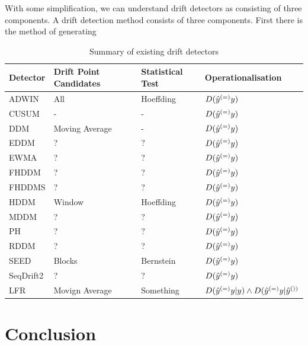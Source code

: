 With some simplification, we can understand drift detectors as consisting of three components. A drift detection method consists of three components. First there is the method of generating 

\begin{table}[]
    \centering
    \begin{tabular}{|l|l|l|l|}
         \toprule
         Detector & Drift Point Candidates & Statistical Test & Operationalisation  \\
         \midrule
         ADWIN & All & Hoeffding & $D(\hat{y}^{(=)}y)$ \\
         CUSUM & - & - & $D(\hat{y}^{(=)}y)$ \\
         DDM & Moving Average & - & $D(\hat{y}^{(=)}y)$ \\
         EDDM & ? & ? & $D(\hat{y}^{(=)}y)$ \\
         EWMA & ? & ? & $D(\hat{y}^{(=)}y)$ \\
         FHDDM & ? & ? & $D(\hat{y}^{(=)}y)$ \\
         FHDDMS & ? & ? & $D(\hat{y}^{(=)}y)$ \\
         HDDM & Window & Hoeffding & $D(\hat{y}^{(=)}y)$ \\ 
         MDDM & ? & ? & $D(\hat{y}^{(=)}y)$ \\
         PH & ? & ? & $D(\hat{y}^{(=)}y)$ \\
         RDDM & ? & ? & $D(\hat{y}^{(=)}y)$ \\
         SEED & Blocks & Bernstein & $D(\hat{y}^{(=)}y)$ \\ 
         SeqDrift2 & ? & ? & $D(\hat{y}^{(=)}y)$ \\
         LFR & Movign Average & Something & $D(\hat{y}^{(=)}y|y) \land D(\hat{y}^{(=)}y|\hat{y}^{())}$  \\
         \bottomrule
    \end{tabular}
    \caption{Summary of existing drift detectors}
    \label{tab:drift_detectors}
\end{table}


\section{Conclusion} \label{background:conclusion}


